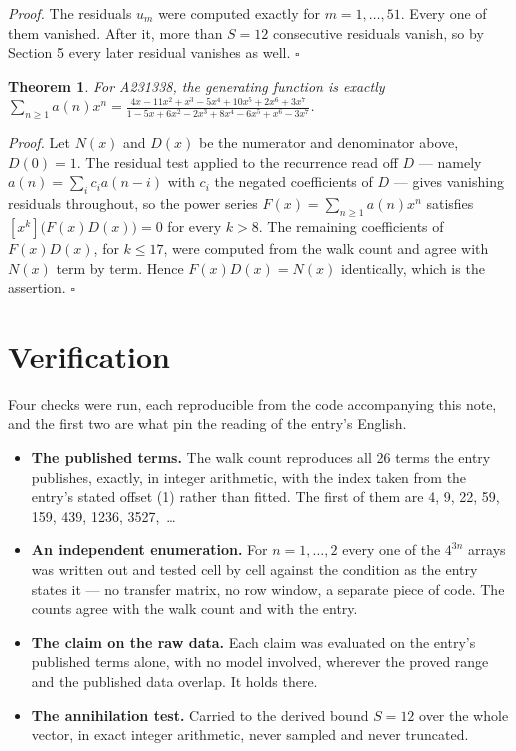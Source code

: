 \documentclass[11pt]{article}
\newtheorem{theorem}{Theorem}
\theoremstyle{definition}
\begin{document}
{\itshape Proof.} The residuals $u_m$ were computed exactly for $m = 1,\dots,51$. Every one of them vanished. After it, more than $S = 12$ consecutive residuals vanish, so by Section 5 every later residual vanishes as well. $\square$

\begin{theorem} For A231338, the generating function is exactly $\sum_{n\ge 1} a(n)x^n = \frac{4x - 11x^{2} + x^{3} - 5x^{4} + 10x^{5} + 2x^{6} + 3x^{7}}{1 - 5x + 6x^{2} - 2x^{3} + 8x^{4} - 6x^{5} + x^{6} - 3x^{7}}$.\end{theorem}

{\itshape Proof.} Let $N(x)$ and $D(x)$ be the numerator and denominator above, $D(0)=1$. The residual test applied to the recurrence read off $D$ --- namely $a(n) = \sum_i c_i a(n-i)$ with $c_i$ the negated coefficients of $D$ --- gives vanishing residuals throughout, so the power series $F(x)=\sum_{n\ge 1}a(n)x^n$ satisfies $[x^k]\bigl(F(x)D(x)\bigr) = 0$ for every $k > 8$. The remaining coefficients of $F(x)D(x)$, for $k \le 17$, were computed from the walk count and agree with $N(x)$ term by term. Hence $F(x)D(x) = N(x)$ identically, which is the assertion. $\square$

\section{Verification}

Four checks were run, each reproducible from the code accompanying this note, and the first two are what pin the reading of the entry's English.

\begin{itemize}

\item {\bfseries The published terms.} The walk count reproduces all 26 terms the entry publishes, exactly, in integer arithmetic, with the index taken from the entry's stated offset (1) rather than fitted. The first of them are 4, 9, 22, 59, 159, 439, 1236, 3527,~\dots

\item {\bfseries An independent enumeration.} For $n = 1,\dots,2$ every one of the $4^{3n}$ arrays was written out and tested cell by cell against the condition as the entry states it --- no transfer matrix, no row window, a separate piece of code. The counts agree with the walk count and with the entry.

\item {\bfseries The claim on the raw data.} Each claim was evaluated on the entry's published terms alone, with no model involved, wherever the proved range and the published data overlap. It holds there.

\item {\bfseries The annihilation test.} Carried to the derived bound $S = 12$ over the whole vector, in exact integer arithmetic, never sampled and never truncated.

\end{itemize}
\end{document}
